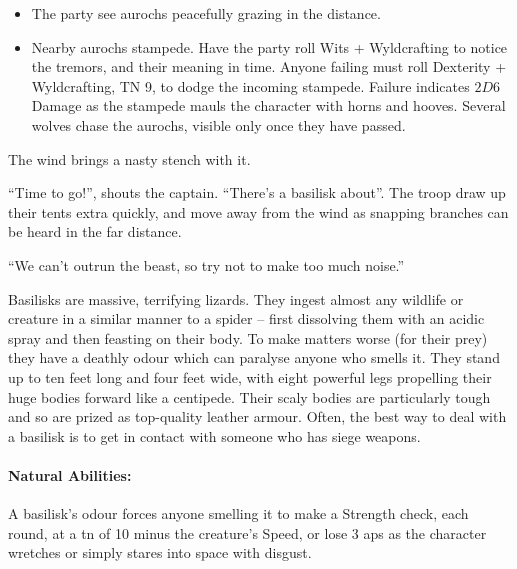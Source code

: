 \begin{multicols}{2}
\begin{itemize}

  \item
  The party see aurochs peacefully grazing in the distance.
  \item
  Nearby aurochs stampede.
  Have the party roll Wits + Wyldcrafting to notice the tremors, and their meaning in time.
  Anyone failing must roll Dexterity + Wyldcrafting, TN 9, to dodge the incoming stampede.
  Failure indicates $2D6$ Damage as the stampede mauls the character with horns and hooves.
  Several wolves chase the aurochs, visible only once they have passed.

\end{itemize}

\label{basilisk}

\begin{boxtext}

  The wind brings a nasty stench with it.

  ``Time to go!'', shouts the captain.
  ``There's a basilisk about''.
  The troop draw up their tents extra quickly, and move away from the wind as snapping branches can be heard in the far distance.

  ``We can't outrun the beast, so try not to make too much noise.''

\end{boxtext}

Basilisks are massive, terrifying lizards.
They ingest almost any wildlife or creature in a similar manner to a spider -- first dissolving them with an acidic spray and then feasting on their body.
To make matters worse (for their prey) they have a deathly odour which can paralyse anyone who smells it.
They stand up to ten feet long and four feet wide, with eight powerful legs propelling their huge bodies forward like a centipede.
Their scaly bodies are particularly tough and so are prized as top-quality leather armour.
Often, the best way to deal with a basilisk is to get in contact with someone who has siege weapons.

\basilisk

\paragraph{Natural Abilities:} A basilisk's odour forces anyone smelling it to make a Strength check, each round, at a \gls{tn} of 10 minus the creature's Speed, or lose 3 \glspl{ap} as the character wretches or simply stares into space with disgust.


\end{multicols}
